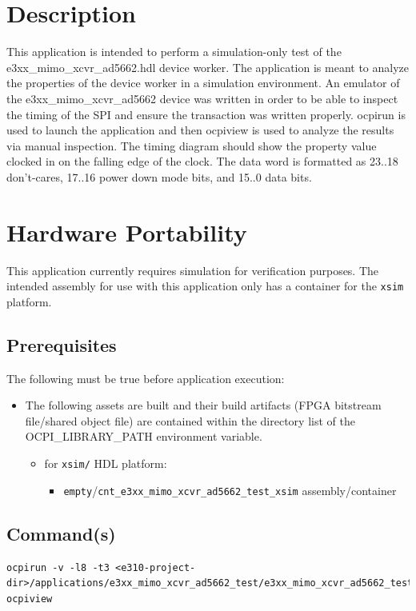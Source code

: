 \section{Description}
This application is intended to perform a simulation-only test of the e3xx\_mimo\_xcvr\_ad5662.hdl device worker. The application is meant to analyze the properties of the device worker in a simulation environment. An emulator of the e3xx\_mimo\_xcvr\_ad5662 device was written in order to be able to inspect the timing of the SPI and ensure the transaction was written properly. ocpirun is used to launch the application and then ocpiview is used to analyze the results via manual inspection. The timing diagram should show the property value clocked in on the falling edge of the clock. The data word is formatted as 23..18 don't-cares, 17..16 power down mode bits, and 15..0 data bits.

\section{Hardware Portability}
This application currently requires simulation for verification purposes. The intended assembly for use with this application only has a container for the \verb+xsim+ platform.

\subsection{Prerequisites}
The following must be true before application execution:
\begin{itemize}
  \item The following assets are built and their build artifacts (FPGA bitstream file/shared object file) are contained within the directory list of the OCPI\_LIBRARY\_PATH environment variable.
  \begin{itemize}
    \item for \verb+xsim/+ HDL platform:
    \begin{itemize}
      \item \verb+empty+/\verb+cnt_e3xx_mimo_xcvr_ad5662_test_xsim+ assembly/container
    \end{itemize}
  \end{itemize}
\end{itemize}
\subsection{Command(s)}
\begin{lstlisting}
ocpirun -v -l8 -t3 <e310-project-dir>/applications/e3xx_mimo_xcvr_ad5662_test/e3xx_mimo_xcvr_ad5662_test.xml
ocpiview
\end{lstlisting}
\pagebreak
